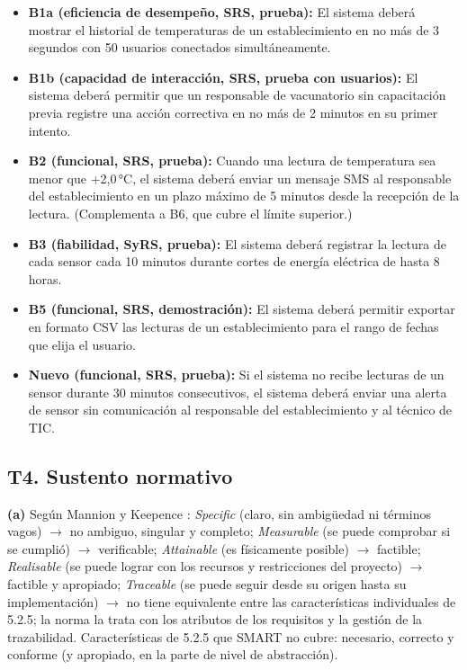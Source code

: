 \documentclass[11pt]{article}
\newcommand{\subseccion}[1]{\subsection{\textcolor{midblue}{#1}}}
\begin{document}
\begin{itemize}[leftmargin=18pt,itemsep=3pt]
	\item \textbf{B1a (eficiencia de desempeño, SRS, prueba):} El sistema deberá mostrar el historial de temperaturas de un establecimiento en no más de 3 segundos con 50 usuarios conectados simultáneamente.
	\item \textbf{B1b (capacidad de interacción, SRS, prueba con usuarios):} El sistema deberá permitir que un responsable de vacunatorio sin capacitación previa registre una acción correctiva en no más de 2 minutos en su primer intento.
	\item \textbf{B2 (funcional, SRS, prueba):} Cuando una lectura de temperatura sea menor que +2,0\,°C, el sistema deberá enviar un mensaje SMS al responsable del establecimiento en un plazo máximo de 5 minutos desde la recepción de la lectura. (Complementa a B6, que cubre el límite superior.)
	\item \textbf{B3 (fiabilidad, SyRS, prueba):} El sistema deberá registrar la lectura de cada sensor cada 10 minutos durante cortes de energía eléctrica de hasta 8 horas.
	\item \textbf{B5 (funcional, SRS, demostración):} El sistema deberá permitir exportar en formato CSV las lecturas de un establecimiento para el rango de fechas que elija el usuario.
	\item \textbf{Nuevo (funcional, SRS, prueba):} Si el sistema no recibe lecturas de un sensor durante 30 minutos consecutivos, el sistema deberá enviar una alerta de sensor sin comunicación al responsable del establecimiento y al técnico de TIC.
\end{itemize}

\subseccion{T4. Sustento normativo}

\textbf{(a)} Según Mannion y Keepence \citep{mannion_smart_1995}: \emph{Specific} (claro, sin ambigüedad ni términos vagos) $\rightarrow$ no ambiguo, singular y completo; \emph{Measurable} (se puede comprobar si se cumplió) $\rightarrow$ verificable; \emph{Attainable} (es físicamente posible) $\rightarrow$ factible; \emph{Realisable} (se puede lograr con los recursos y restricciones del proyecto) $\rightarrow$ factible y apropiado; \emph{Traceable} (se puede seguir desde su origen hasta su implementación) $\rightarrow$ no tiene equivalente entre las características individuales de 5.2.5; la norma la trata con los atributos de los requisitos y la gestión de la trazabilidad. Características de 5.2.5 que SMART no cubre: necesario, correcto y conforme (y apropiado, en la parte de nivel de abstracción).
\end{document}
